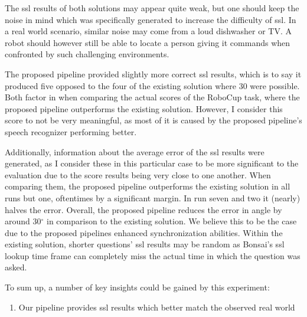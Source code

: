The \gls{ssl} results of both solutions may appear quite weak, but one should keep the noise in mind which was specifically generated to increase the difficulty of \gls{ssl}.
In a real world scenario, similar noise may come from a loud dishwasher or TV.
A robot should however still be able to locate a person giving it commands when confronted by such challenging environments.

The proposed pipeline provided slightly more correct \gls{ssl} results, which is to say it produced five opposed to the four of the existing solution where 30 were possible.
Both factor in when comparing the actual scores of the RoboCup task, where the proposed pipeline outperforms the existing solution.
However, I consider this score to not be very meaningful, as most of it is caused by the proposed pipeline's speech recognizer performing better.

Additionally, information about the average error of the \gls{ssl} results were generated, as I consider these in this particular case to be more significant to the evaluation due to the score results being very close to one another.
When comparing them, the proposed pipeline outperforms the existing solution in all runs but one, oftentimes by a significant margin.
In run seven and two it (nearly) halves the error.
Overall, the proposed pipeline reduces the error in angle by around 30$^\circ$ in comparison to the existing solution.
We believe this to be the case due to the proposed pipelines enhanced synchronization abilities.
Within the existing solution, shorter questions' \gls{ssl} results may be random as Bonsai's \gls{ssl} lookup time frame can completely miss the actual time in which the question was asked.

To sum up, a number of key insights could be gained by this experiment:

\begin{enumerate}
	\item Our pipeline provides \gls{ssl} results which better match the observed real world 
\end{enumerate}














